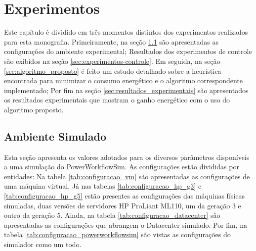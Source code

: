 \chapter{Experimentos}
\label{cap:experimentos}
Este capítulo é dividido em três momentos distintos dos experimentos realizados
para esta monografia. Primeiramente, na seção \ref{sec:ambiente_simulado} são
apresentadas as configurações do ambiente experimental; Resultados dos 
experimentos de controle são exibidos na seção \ref{sec:experimentos-controle}.
Em seguida, na seção
\ref{sec:algoritmo_proposto} é feito um estudo detalhado sobre a heurística
encontrada para minimizar o consumo energético e o algoritmo correspondente
implementado; Por fim na seção \ref{sec:resultados_experimentais} são
apresentados os resultados experimentais que mostram o ganho energético com
o uso do algoritmo proposto.


\section{Ambiente Simulado}
\label{sec:ambiente_simulado}
Esta seção apresenta os valores adotados para os diversos parâmetros disponíveis
a uma simulação do PowerWorkflowSim. As configurações estão divididas
por entidades: Na tabela \ref{tab:configuracao_vm} são apresentadas as
configurações de uma máquina virtual. Já nas tabelas \ref{tab:configuracao_hp_g3}
e \ref{tab:configuracao_hp_g5} estão presentes as configurações das máquinas
físicas simuladas, duas versões de servidores HP ProLiant ML110, um da geração 3
e outro da geração 5. Ainda, na tabela \ref{tab:configuracao_datacenter} são
apresentadas as configurações que abrangem o Datacenter simulado. Por fim,
na tabela \ref{tab:configuracao_powerworkflowsim} são vistas as configurações
do simulador como um todo.

